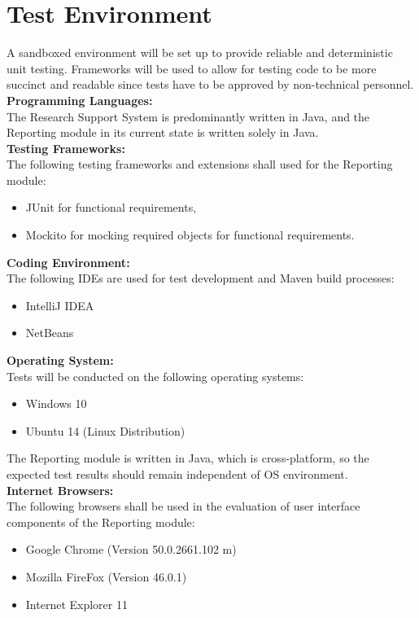 \section{Test Environment}
\label{sec:testEnv}
A sandboxed environment will be set up to provide reliable and deterministic unit testing. Frameworks will be used to allow for testing code to be more succinct and readable since tests have to be approved by non-technical personnel. \\

\textbf{Programming Languages:}\\
The Research Support System is predominantly written in Java, and the Reporting 
module in its current state is written solely in Java. \\

\textbf{Testing Frameworks:}\\
The following testing frameworks and extensions shall used for the Reporting module:
\begin{itemize}
	\item JUnit for functional requirements, 
	\item Mockito for mocking required objects for functional requirements.
\end{itemize}

\textbf{Coding Environment:}\\
The following IDEs are used for test development and Maven build processes:
\begin{itemize}
	\item IntelliJ IDEA
	\item NetBeans
\end{itemize}

\textbf{Operating System:} \\
Tests will be conducted on the following operating systems:
\begin{itemize}
	\item Windows 10
	\item Ubuntu 14 (Linux Distribution)
\end{itemize}
The Reporting module is written in Java, which is cross-platform, so the 
expected test results should remain independent of OS environment.\\

\textbf{Internet Browsers:}\\
The following browsers shall be used in the evaluation of user interface 
components of the Reporting module:
\begin{itemize}
	\item Google Chrome (Version 50.0.2661.102 m)
	\item Mozilla FireFox (Version 46.0.1)
	\item Internet Explorer 11
\end{itemize}

